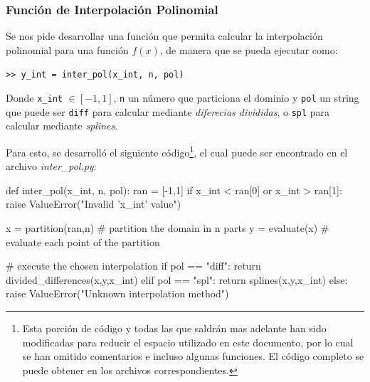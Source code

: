 \documentclass[12pt,letterpaper]{article}
\begin{document}
\subsubsection{Función de Interpolación Polinomial}
Se nos pide desarrollar una función que permita calcular la interpolación polinomial para una función $f(x)$, de manera que se pueda ejecutar como:
\begin{center}
\verb+>> y_int = inter_pol(x_int, n, pol)+
\end{center}

Donde \verb+x_int+ $\in [-1,1]$, \verb+n+ un número que particiona el dominio y \verb+pol+ un string que puede ser \verb+diff+ para calcular mediante \textit{diferecias divididas}, o \verb+spl+ para calcular mediante \textit{splines}.

Para esto, se desarrolló el siguiente código\footnote{Esta porción de código y todas las que saldrán mas adelante han sido modificadas para reducir el espacio utilizado en este documento, por lo cual se han omitido comentarios e incluso algunas funciones. El código completo se puede obtener en los archivos correspondientes.}, el cual puede ser encontrado en el archivo \textit{inter\_pol.py}:
\begin{verbatimtab}[4]
def inter_pol(x_int, n, pol):
	ran = [-1,1]
	if x_int < ran[0] or x_int > ran[1]:
		raise ValueError("Invalid 'x_int' value")
	
	x = partition(ran,n) # partition the domain in n parts
	y = evaluate(x) # evaluate each point of the partition
	
	# execute the chosen interpolation
	if pol == "diff":
		return divided_differences(x,y,x_int)
	elif pol == "spl":
		return splines(x,y,x_int)
	else:
		raise ValueError("Unknown interpolation method")
\end{verbatimtab}
\end{document}
